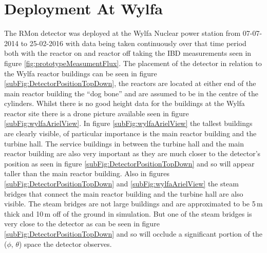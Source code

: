
\section{Deployment At Wylfa}\label{sec:deploymentAtWylfa}
The RMon detector was deployed at the Wylfa Nuclear power station from 07-07-2014 to 25-02-2016 with data being taken continuously over that time period both with the reactor on and reactor off taking the IBD measurements seen in figure \ref{fig:prototypeMeasumentFlux}. The placement of the detector in relation to the Wylfa reactor buildings can be seen in figure \ref{subFig:DetectorPositionTopDown}, the reactors are located at either end of the main reactor building the ``dog bone'' and are assumed to be in the centre of the cylinders. Whilst there is no good height data for the buildings at the Wylfa reactor site there is a drone picture available seen in figure \ref{subFig:wylfaArielView}. In figure \ref{subFig:wylfaArielView} the tallest buildings are clearly visible, of particular importance is the main reactor building and the turbine hall. The service buildings in between the turbine hall and the  main reactor building are also very important as they are much closer to the detector's position as seen in figure \ref{subFig:DetectorPositionTopDown} and so will appear taller than the main reactor building. Also in figures \ref{subFig:DetectorPositionTopDown} and \ref{subFig:wylfaArielView} the steam bridges that connect the main reactor building and the turbine hall are also visible. The steam bridges are not large buildings and are approximated to be 5\,m thick and 10\,m off of the ground in simulation. But one of the steam bridges is very close to the detector as can be seen in figure \ref{subFig:DetectorPositionTopDown} and so will occlude a significant portion of the ($\phi$, $\theta$) space the detector observes. 

